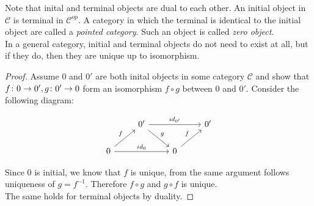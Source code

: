 Note that inital and terminal objects are dual to each other.
An initial object in $\mathscr{C}$ is terminal in $\mathscr{C}^{op}$.
A category in which the terminal is identical to the initial object are called a \emph{pointed category}.
Such an object is called \emph{zero object}.\\
In a general category, initial and terminal objects do not need to exist at all,
but if they do, then they are unique up to isomorphism.

\begin{proof}
Assume $0$ and $0'$ are both inital objects in some category $\mathscr{C}$ and show that
$f \from 0 \to 0', g \from 0' \to 0$ form an isomorphism
$f \circ g$ between $0$ and $0'$. Consider the following diagram:

\[
\begin{tikzcd}
  & 0' \arrow{dr}{g} \arrow{rr}{id_{0'}}    &&  0'\\
  0 \arrow{ur}{f} \arrow{rr}{id_0} && 0 \arrow{ur}{f}
\end{tikzcd}
\]

Since $0$ is initial, we know that $f$ is unique, from the same argument follows uniqueness of $g = f^{-1}$.
Therefore $f \circ g$ and $g \circ f$ is unique.\\
The same holds for terminal objects by duality.
\end{proof}


